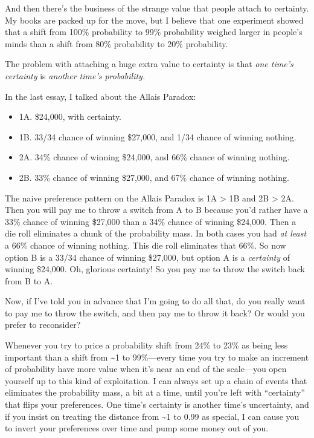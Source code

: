 {
 And then there's the business of the strange value
that people attach to certainty. My books are packed up for the move,
but I believe that one experiment showed that a shift from 100\%
probability to 99\% probability weighed larger in
people's minds than a shift from 80\% probability to
20\% probability.}

{
 The problem with attaching a huge extra value to certainty is that
\textit{one time's certainty} is \textit{another
time's probability.}}

{
 In the last essay, I talked about the Allais Paradox:}

\begin{itemize}
\item {
 1A. \$24,000, with certainty.}

\item {
 1B. 33/34 chance of winning \$27,000, and 1/34 chance of winning
nothing.}

\item {
 2A. 34\% chance of winning \$24,000, and 66\% chance of winning
nothing.}

\item {
 2B. 33\% chance of winning \$27,000, and 67\% chance of winning
 nothing.}
\end{itemize}

{
 The naive preference pattern on the Allais Paradox is 1A
{\textgreater} 1B and 2B {\textgreater} 2A. Then you will pay me to
throw a switch from A to B because you'd rather have a
33\% chance of winning \$27,000 than a 34\% chance of winning \$24,000.
Then a die roll eliminates a chunk of the probability mass. In both
cases you had \textit{at least} a 66\% chance of winning nothing. This
die roll eliminates that 66\%. So now option B is a 33/34 chance of
winning \$27,000, but option A is a \textit{certainty} of winning
\$24,000. Oh, glorious certainty! So you pay me to throw the switch
back from B to A.}

{
 Now, if I've told you in advance that
I'm going to do all that, do you really want to pay me
to throw the switch, and then pay me to throw it back? Or would you
prefer to reconsider?}

{
 Whenever you try to price a probability shift from 24\% to 23\% as
being less important than a shift from \~{}1 to 99\%---every time you
try to make an increment of probability have more value when
it's near an end of the scale---you open yourself up to
this kind of exploitation. I can always set up a chain of events that
eliminates the probability mass, a bit at a time, until
you're left with
``certainty'' that flips your
preferences. One time's certainty is another
time's uncertainty, and if you insist on treating the
distance from \~{}1 to 0.99 as special, I can cause you to invert your
preferences over time and pump some money out of you.}

